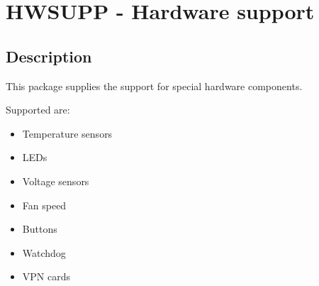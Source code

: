 \section {HWSUPP - Hardware support}

\subsection {Description}

This package supplies the support for special hardware components.

Supported are:
\begin{itemize}
\item Temperature sensors
\item LEDs
\item Voltage sensors
\item Fan speed
\item Buttons
\item Watchdog
\item VPN cards
\end{itemize}

